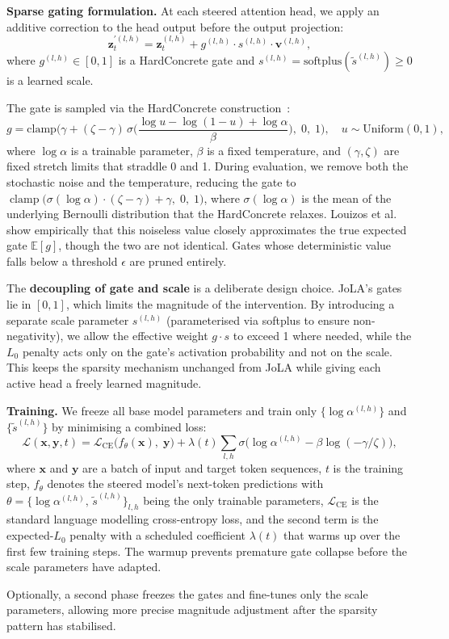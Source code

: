 \textbf{Sparse gating formulation.} At each steered attention head, we apply an additive correction to the head output before the output projection:
\begin{equation}\label{eq:correction}
    \mathbf{z}_t^{\prime(l,h)} = \mathbf{z}_t^{(l,h)} + g^{(l,h)} \cdot s^{(l,h)} \cdot \mathbf{v}^{(l,h)},
\end{equation}
where $g^{(l,h)} \in [0,1]$ is a HardConcrete gate and $s^{(l,h)} = \text{softplus}(\tilde{s}^{(l,h)}) \geq 0$ is a learned scale.

The gate is sampled via the HardConcrete construction~\cite{louizos2018hardconcrete}:
\begin{equation}
    g = \text{clamp}\!\Big(\gamma + (\zeta - \gamma)\,\sigma\!\Big(\frac{\log u - \log(1-u) + \log\alpha}{\beta}\Big),\; 0,\; 1\Big), \quad u \sim \text{Uniform}(0,1),
\end{equation}
where $\log\alpha$ is a trainable parameter, $\beta$ is a fixed temperature, and $(\gamma, \zeta)$ are fixed stretch limits that straddle 0 and 1.
During evaluation, we remove both the stochastic noise and the temperature, reducing the gate to $\operatorname{clamp}\!\bigl(\sigma(\log\alpha)\cdot(\zeta-\gamma)+\gamma,\;0,\;1\bigr)$, where $\sigma(\log\alpha)$ is the mean of the underlying Bernoulli distribution that the HardConcrete relaxes. Louizos et al.~\cite{louizos2018hardconcrete} show empirically that this noiseless value closely approximates the true expected gate $\mathbb{E}[g]$, though the two are not identical. Gates whose deterministic value falls below a threshold $\epsilon$ are pruned entirely.

The \textbf{decoupling of gate and scale} is a deliberate design choice.
JoLA's gates lie in $[0,1]$, which limits the magnitude of the intervention.
By introducing a separate scale parameter $s^{(l,h)}$ (parameterised via softplus to ensure non-negativity), we allow the effective weight $g \cdot s$ to exceed 1 where needed, while the $L_0$ penalty acts only on the gate's activation probability and not on the scale.
This keeps the sparsity mechanism unchanged from JoLA while giving each active head a freely learned magnitude.

\textbf{Training.} We freeze all base model parameters and train only $\{\log\alpha^{(l,h)}\}$ and $\{\tilde{s}^{(l,h)}\}$ by minimising a combined loss:
\begin{equation}
    \mathcal{L}(\mathbf{x}, \mathbf{y}, t) = \mathcal{L}_\text{CE}\!\big(f_\theta(\mathbf{x}),\; \mathbf{y}\big) + \lambda(t) \sum_{l,h} \sigma\!\big(\log\alpha^{(l,h)} - \beta\log(-\gamma / \zeta)\big),
\end{equation}
where $\mathbf{x}$ and $\mathbf{y}$ are a batch of input and target token sequences, $t$ is the training step, $f_\theta$ denotes the steered model's next-token predictions with $\theta = \{\log\alpha^{(l,h)},\, \tilde{s}^{(l,h)}\}_{l,h}$ being the only trainable parameters, $\mathcal{L}_\text{CE}$ is the standard language modelling cross-entropy loss, and the second term is the expected-$L_0$ penalty with a scheduled coefficient $\lambda(t)$ that warms up over the first few training steps.
The warmup prevents premature gate collapse before the scale parameters have adapted.

Optionally, a second phase freezes the gates and fine-tunes only the scale parameters, allowing more precise magnitude adjustment after the sparsity pattern has stabilised.

